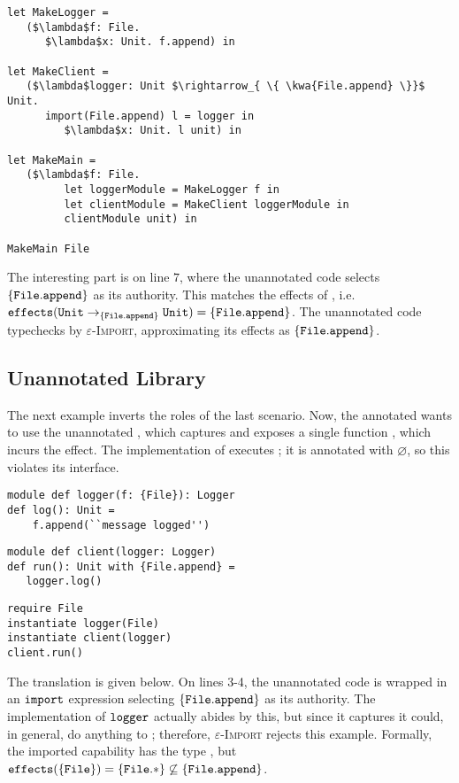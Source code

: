 \begin{lstlisting}
let MakeLogger =
   ($\lambda$f: File.
      $\lambda$x: Unit. f.append) in
          
let MakeClient =
   ($\lambda$logger: Unit $\rightarrow_{ \{ \kwa{File.append} \}}$ Unit.
      import(File.append) l = logger in
         $\lambda$x: Unit. l unit) in
          
let MakeMain =
   ($\lambda$f: File.
         let loggerModule = MakeLogger f in
         let clientModule = MakeClient loggerModule in
         clientModule unit) in

MakeMain File
\end{lstlisting}

The interesting part is on line $7$, where the unannotated code selects $\{ \mathtt{File.append} \}$ as its authority. This matches the effects of , i.e.
 $\mathtt{effects}(\mathtt{Unit} \rightarrow_{\{\mathtt{File.append}\}} \mathtt{Unit}) = \{
 \mathtt{File.append} \}$. The unannotated code typechecks by \textsc{$\varepsilon$-Import}, approximating its effects as $\mathtt{\{ \mathtt{File.append} \}}$.

\subsection{Unannotated Library}

The next example inverts the roles of the last scenario. Now, the annotated 
 wants to use the unannotated , which captures 
 and exposes a single function , which incurs the
  effect. The implementation of  executes
 ; it is annotated with $\varnothing$, so this violates its interface.

\begin{lstlisting}
module def logger(f: {File}): Logger
def log(): Unit =
    f.append(``message logged'')
\end{lstlisting}

\begin{lstlisting}
module def client(logger: Logger)
def run(): Unit with {File.append} =
   logger.log()
\end{lstlisting}

\begin{lstlisting}
require File
instantiate logger(File)
instantiate client(logger)
client.run()
\end{lstlisting}

The translation is given below. On lines 3-4, the unannotated code is wrapped
in an $\mathtt{import}$ expression selecting $\{ \mathtt{File.append} \}$ as its
authority. The implementation of $\mathtt{logger}$ actually abides by this, but
since it captures 
 it could, in general, do anything to ; therefore,
\textsc{$\varepsilon$-Import} rejects this example. Formally, the imported capability
has the type , but $\mathtt{effects}(\{ \mathtt{File} \}) = \{ \mathtt{File}.* \}
\not\subseteq \{ \mathtt{ File.append } \}$.

